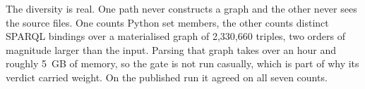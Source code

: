 The diversity is real. One path never constructs a graph and the other never
sees the source files. One counts Python set members, the other counts distinct
SPARQL bindings over a materialised graph of 2,330,660 triples, two orders of
magnitude larger than the input. Parsing that graph takes over an hour and
roughly 5~GB of memory, so the gate is not run casually, which is part of why its
verdict carried weight. On the published run it agreed on all seven counts.
